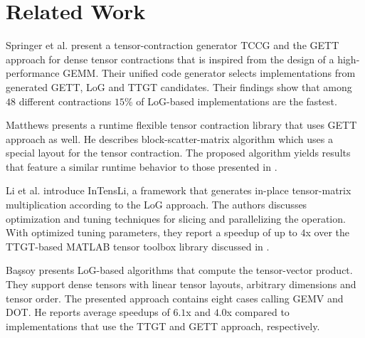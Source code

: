 \section{Related Work}
\label{sec:related}

\begin{comment}
The authors in \cite{dinapoli:2014:towards.efficient.use} discuss the efficient tensor contractions with highly optimized BLAS. 
Based on the LoG approach, they define requirements for the use of \tf{gemm} for class 3 tensor contractions and provide slicing techniques for tensors. %
The slicing recipe for the class 2 categorized tensor contractions contains a short description with a rule of thumb for maximizing performance.
Runtime measurements cover class 3 tensor contractions.
\end{comment}

Springer et al. \cite{springer:2018:design} present a tensor-contraction generator TCCG and the GETT approach for dense tensor contractions that is inspired from the design of a high-performance GEMM.
Their unified code generator selects implementations from generated GETT, LoG and TTGT candidates.
Their findings show that among $48$ different contractions $15$\% of LoG-based implementations are the fastest.

Matthews \cite{matthews:2018:high} presents a runtime flexible tensor contraction library that uses GETT approach as well.
He describes block-scatter-matrix algorithm which uses a special layout for the tensor contraction.
The proposed algorithm yields results that feature a similar runtime behavior to those presented in \cite{springer:2018:design}.

Li et al. \cite{li:2015:input} introduce InTensLi, a framework that generates in-place tensor-matrix multiplication according to the LoG approach. 
The authors discusses optimization and tuning techniques for slicing and parallelizing the operation.
With optimized tuning parameters, they report a speedup of up to $4$x over the TTGT-based MATLAB tensor toolbox library discussed in \cite{bader:2006:algorithm862}.

Ba\c{s}soy \cite{bassoy:2019:ttv} presents LoG-based algorithms that compute the tensor-vector product. 
They support dense tensors with linear tensor layouts, arbitrary dimensions and tensor order.
The presented approach contains eight cases calling GEMV and DOT.
He reports average speedups of $6.1$x and $4.0$x compared to implementations that use the TTGT and GETT approach, respectively.

